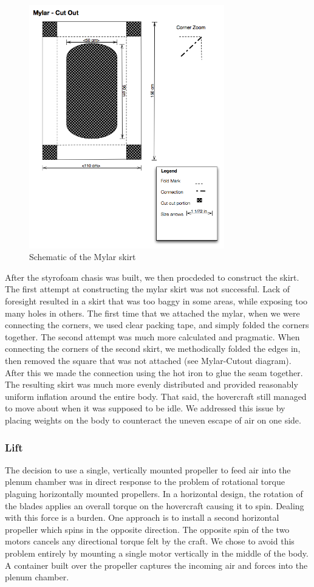 \begin{figure}[h]
  \begin{center}
    \includegraphics[width=85mm]{imageSources/mylarSchematic.png}
  \end{center}
  \caption{Schematic of the Mylar skirt} 
  \label{mylarSchematic}
\end{figure}

After the styrofoam chasis was built, we then procdeded to construct the skirt. The first attempt at constructing the mylar skirt was not successful. Lack of foresight resulted in a skirt that was too baggy in some areas, while exposing too many holes in others. The first time that we attached the mylar, when we were connecting the corners, we used clear packing tape, and simply folded the corners together. The second attempt was much more calculated and pragmatic. When connecting the corners of the second skirt, we methodically folded the edges in, then removed the square that was not attached (see Mylar-Cutout diagram). After this we made the connection using the hot iron to glue the seam together. The resulting skirt was much more evenly distributed and provided reasonably uniform inflation around the entire body. That said, the hovercraft still managed to move about when it was supposed to be idle. We addressed this issue by placing weights on the body to counteract the uneven escape of air on one side.

\subsubsection{Lift}
The decision to use a single, vertically mounted propeller to feed air into the plenum chamber was in direct response to the problem of rotational torque plaguing horizontally mounted propellers. In a horizontal design, the rotation of the blades applies an overall torque on the hovercraft causing it to spin. Dealing with this force is a burden. One approach is to install a second horizontal propeller which spins in the opposite direction. The opposite spin of the two motors cancels any directional torque felt by the craft. We chose to avoid this problem entirely by mounting a single motor vertically in the middle of the body. A container built over the propeller captures the incoming air and forces into the plenum chamber.

